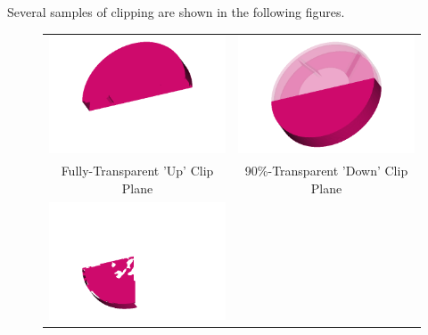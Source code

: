 \documentclass[letterpaper,12pt]{article}
\begin{document}
Several samples of clipping are shown in the following figures.
\\
\begin{figure}[!h!tbp]
\begin{center}
\begin{tabular}{ c c }
\includegraphics[scale=0.263157894737]{./Figures/Fully-TransparentUPClipPlane.png}
 & \includegraphics[scale=0.263157894737]{./Figures/90-TransparentDownClipPlane.png}
 \\ Fully-Transparent 'Up' Clip Plane & 90\%-Transparent 'Down' Clip Plane \\
\includegraphics[scale=0.263157894737]{./Figures/Fully-TransparentMaxClipBox.png}

\end{tabular}
\end{center}
\end{figure}
\end{document}

